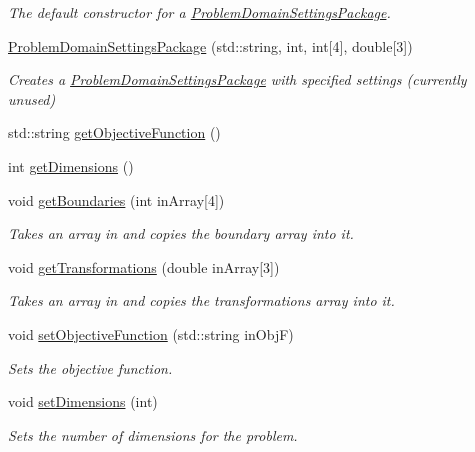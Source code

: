 \begin{DoxyCompactItemize}
\begin{DoxyCompactList}\small\item\em The default constructor for a \hyperlink{class_problem_domain_settings_package}{Problem\+Domain\+Settings\+Package}. \end{DoxyCompactList}\item 
\hyperlink{class_problem_domain_settings_package_ab2c7252d5998c4b2d77f1dca25d030e3}{Problem\+Domain\+Settings\+Package} (std\+::string, int, int\mbox{[}4\mbox{]}, double\mbox{[}3\mbox{]})
\begin{DoxyCompactList}\small\item\em Creates a \hyperlink{class_problem_domain_settings_package}{Problem\+Domain\+Settings\+Package} with specified settings (currently unused) \end{DoxyCompactList}\item 
std\+::string \hyperlink{class_problem_domain_settings_package_a858c5f6501fe46a6469422ca87cbc227}{get\+Objective\+Function} ()
\item 
int \hyperlink{class_problem_domain_settings_package_a1ff00f66433a26e87176915159207a53}{get\+Dimensions} ()
\item 
void \hyperlink{class_problem_domain_settings_package_a004beb40525bd9254a1e9cbb60aac7c9}{get\+Boundaries} (int in\+Array\mbox{[}4\mbox{]})
\begin{DoxyCompactList}\small\item\em Takes an array in and copies the boundary array into it. \end{DoxyCompactList}\item 
void \hyperlink{class_problem_domain_settings_package_a354779476d267a4a5cc39c55c6655a14}{get\+Transformations} (double in\+Array\mbox{[}3\mbox{]})
\begin{DoxyCompactList}\small\item\em Takes an array in and copies the transformations array into it. \end{DoxyCompactList}\item 
void \hyperlink{class_problem_domain_settings_package_ad08819f63bb7d05409489ba9c6049f92}{set\+Objective\+Function} (std\+::string in\+ObjF)
\begin{DoxyCompactList}\small\item\em Sets the objective function. \end{DoxyCompactList}\item 
void \hyperlink{class_problem_domain_settings_package_a99993d6577bd93023adb2cdad0443069}{set\+Dimensions} (int)
\begin{DoxyCompactList}\small\item\em Sets the number of dimensions for the problem. \end{DoxyCompactList}\item 

\end{DoxyCompactItemize}
